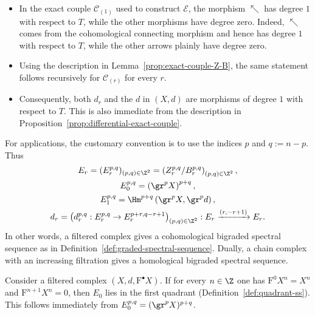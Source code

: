 \begin{itemize}
	\item In the exact couple $\mathscr{C}_{(1)}$ used to construct
	$\mathscr{E}$, the morphism $\nwarrow$ has degree $1$ with respect to $T$,
	while the other morphisms have degree zero. Indeed, $\nwarrow$ comes from
	the cohomological connecting morphism and hence has degree $1$ with respect
	to $T$, while the other arrows plainly have degree zero.
	\item Using the description in Lemma~\ref{prop:exact-couple-Z-B}, the same
	statement follows recursively for $\mathscr{C}_{(r)}$ for every $r$.
	\item Consequently, both $d_r$ and the $d$ in $(X,d)$ are morphisms of
	degree $1$ with respect to $T$. This is also immediate from the description
	in Proposition~\ref{prop:differential-exact-couple}.
\end{itemize}

For applications, the customary convention is to use the indices $p$ and
$q:=n-p$. Thus
\begin{gather*}
	E_r=(E_r^{p,q})_{(p,q)\in\Z^2}
	=\left(Z_r^{p,q}/B_r^{p,q}\right)_{(p,q)\in\Z^2}, \\
	E_0^{p,q}=\left(\gr^pX\right)^{p+q}, \\
	E_1^{p,q}=\Hm^{p+q}\left(\gr^pX,\gr^pd\right), \\
	d_r=\left(d_r^{p,q}:E_r^{p,q}\to E_r^{p+r,q-r+1}\right)_{(p,q)\in\Z^2}
	:E_r\xrightarrow{(r,-r+1)}E_r.
\end{gather*}
In other words, a filtered complex gives a cohomological bigraded spectral
sequence as in Definition~\ref{def:graded-spectral-sequence}. Dually, a chain
complex with an increasing filtration gives a homological bigraded spectral
sequence.

\begin{example}\label{eg:canonically-bdd-ss}
	Consider a filtered complex $(X,d,\mathrm{F}^\bullet X)$. If for every
	$n\in\Z$ one has $\mathrm{F}^0X^n=X^n$ and
	$\mathrm{F}^{n+1}X^n=0$, then $E_0$ lies in the first quadrant
	(Definition~\ref{def:quadrant-ss}). This follows immediately from
	$E_0^{p,q}=(\gr^pX)^{p+q}$.
\end{example}

